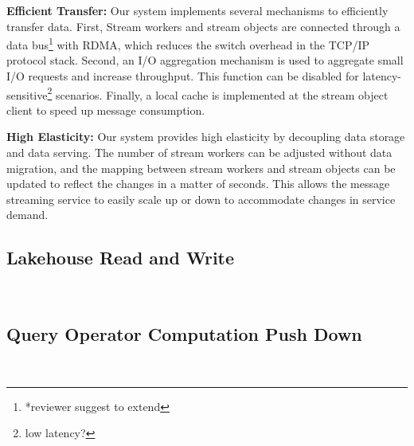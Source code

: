 
\noindent\textbf{Efficient Transfer:} Our system implements several mechanisms to efficiently transfer data. First, Stream workers and stream objects are connected through a data bus\footnote{*reviewer suggest to extend} with RDMA, which reduces the switch overhead in the TCP/IP protocol stack. Second, an I/O aggregation mechanism is used to aggregate small I/O requests and increase throughput. This function can be disabled for latency-sensitive\footnote{low latency?} scenarios. Finally, a local cache is implemented at the stream object client to speed up message consumption.

\noindent\textbf{High Elasticity:} Our system provides high elasticity by decoupling data storage and data serving. The number of stream workers can be adjusted without data migration, and the mapping between stream workers and stream objects can be updated to reflect the changes in a matter of seconds. This allows the message streaming service to easily scale up or down to accommodate changes in service demand.



\subsection{Lakehouse Read and Write}~\label{subsec:lakehouse}


\subsection{Query Operator Computation Push Down}~\label{subsec:pushdown}